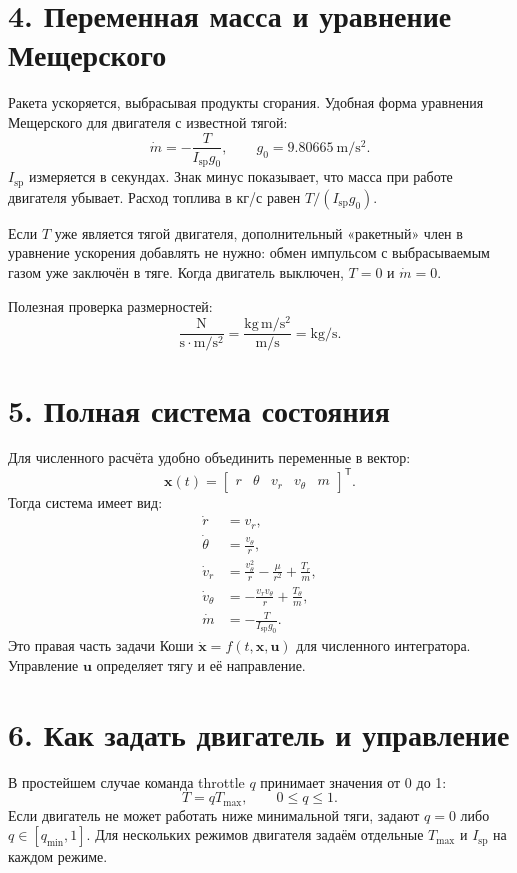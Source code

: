 \documentclass[11pt,a4paper]{article}
\newcommand{\Tmax}{T_{\max}}
\newcommand{\Isp}{I_{\mathrm{sp}}}
\begin{document}
\section{4. Переменная масса и уравнение Мещерского}
Ракета ускоряется, выбрасывая продукты сгорания. Удобная форма уравнения Мещерского для двигателя с известной тягой:
\[
\boxed{\dot m=-\frac{T}{\Isp g_0}},
\qquad g_0=9.80665\ \mathrm{m/s^2}.
\]
$\Isp$ измеряется в секундах. Знак минус показывает, что масса при работе двигателя убывает. Расход топлива в кг/с равен $T/(\Isp g_0)$.

Если $T$ уже является тягой двигателя, дополнительный «ракетный» член в уравнение ускорения добавлять не нужно: обмен импульсом с выбрасываемым газом уже заключён в тяге. Когда двигатель выключен, $T=0$ и $\dot m=0$.

Полезная проверка размерностей:
\[
\frac{\mathrm{N}}{\mathrm{s}\cdot\mathrm{m/s^2}}
=\frac{\mathrm{kg\,m/s^2}}{\mathrm{m/s}}
=\mathrm{kg/s}.
\]

\section{5. Полная система состояния}
Для численного расчёта удобно объединить переменные в вектор:
\[
\mathbf x(t)=
\begin{bmatrix}
r&\theta&v_r&v_\theta&m
\end{bmatrix}^{\mathsf T}.
\]
Тогда система имеет вид:
\[
\boxed{
\begin{aligned}
\dot r&=v_r,\\
\dot\theta&=\frac{v_\theta}{r},\\
\dot v_r&=\frac{v_\theta^2}{r}-\frac{\mu}{r^2}+\frac{T_r}{m},\\
\dot v_\theta&=-\frac{v_rv_\theta}{r}+\frac{T_\theta}{m},\\
\dot m&=-\frac{T}{\Isp g_0}.
\end{aligned}}
\]
Это правая часть задачи Коши $\dot{\mathbf x}=f(t,\mathbf x,\mathbf u)$ для численного интегратора. Управление $\mathbf u$ определяет тягу и её направление.

\section{6. Как задать двигатель и управление}
В простейшем случае команда throttle $q$ принимает значения от 0 до 1:
\[
T=q\Tmax,\qquad 0\le q\le1.
\]
Если двигатель не может работать ниже минимальной тяги, задают $q=0$ либо $q\in[q_{\min},1]$. Для нескольких режимов двигателя задаём отдельные $\Tmax$ и $\Isp$ на каждом режиме.
\end{document}
